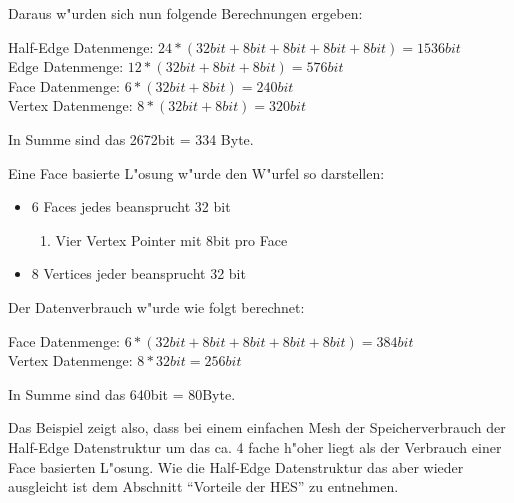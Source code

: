 \documentclass[pagesize, paper=a4, fontsize=12pt,titlepage=true, headings=small, headnosepline, abstractoff, liststotoc, nochapterprefix, plainheadsepline]{scrreprt}
\newcommand{\HES}{Half-Edge Datenstruktur }
\begin{document}
Daraus w"urden sich nun folgende Berechnungen ergeben:

	Half-Edge Datenmenge: \begin{math}24 * (32bit+ 8bit + 8bit + 8bit + 8bit) = 1536bit\end{math}
	\\
	Edge Datenmenge: \begin{math}12 * (32bit + 8bit + 8bit) = 576bit\end{math}
	\\
	Face Datenmenge: \begin{math}6 * (32bit + 8bit) = 240bit\end{math}
	\\
	Vertex Datenmenge: \begin{math}8 * (32bit + 8bit) = 320bit\end{math}

	In Summe sind das 2672bit = 334 Byte.
\newline

Eine Face basierte L"osung w"urde den W"urfel so darstellen:
\begin{itemize}
\item 6 Faces jedes beansprucht 32 bit
	\begin{enumerate}
    	\item Vier Vertex Pointer mit 8bit pro Face
	\end{enumerate}
\item 8 Vertices jeder beansprucht 32 bit
\end{itemize}

Der Datenverbrauch w"urde wie folgt berechnet:

	Face Datenmenge: \begin{math}6 * (32bit + 8bit + 8bit + 8bit + 8bit) = 384bit\end{math}
	\\
	Vertex Datenmenge: \begin{math}8 * 32bit = 256bit\end{math}

	In Summe sind das 640bit = 80Byte.
\newline

Das Beispiel zeigt also, dass bei einem einfachen Mesh der Speicherverbrauch der \HES um das ca. 4 fache h"oher liegt als der Verbrauch einer Face basierten L"osung. Wie die \HES das aber wieder ausgleicht ist dem Abschnitt "`Vorteile der HES"' zu entnehmen.
\end{document}

